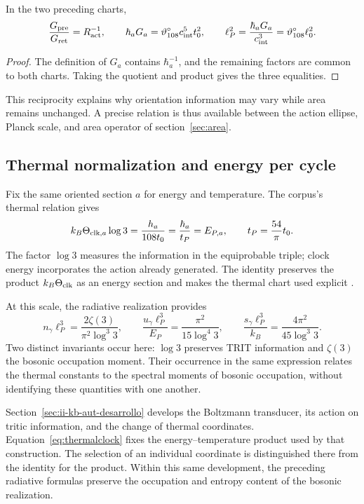 \begin{proposition}
In the two preceding charts,
\[
\frac{G_{\rm pre}}{G_{\rm ret}}=R_{\rm act}^{-1},\qquad
\hbar_aG_a=\vartheta^\circ_{108}c_{\rm int}^5t_0^2,
\qquad
\ell_P^2=\frac{\hbar_aG_a}{c_{\rm int}^3}
=\vartheta^\circ_{108}\ell_0^2.
\]
\end{proposition}
\begin{proof}
The definition of $G_a$ contains $\hbar_a^{-1}$, and the remaining factors
are common to both charts. Taking the quotient and product gives
the three equalities.
\end{proof}
This reciprocity explains why orientation information may
vary while area remains unchanged. A precise relation is thus available
between the action ellipse, Planck scale, and area operator
of section~\ref{sec:area}.

\subsection{Thermal normalization and energy per cycle}
Fix the same oriented section \(a\) for energy and
temperature. The corpus's thermal relation gives
\begin{equation}
k_B\Theta_{{\rm clk},a}\log3
=\frac{h_a}{108t_0}
=\frac{\hbar_a}{t_P}=E_{P,a},
\qquad t_P=\frac{54}{\pi}t_0.
\label{eq:thermalclock}
\end{equation}
The factor $\log3$ measures the information in the equiprobable triple;
clock energy incorporates the action already generated.
The identity preserves the product $k_B\Theta_{\rm clk}$ as an energy
section and makes the thermal chart used explicit \cite{termica}.

At this scale, the radiative realization provides
\[
n_\gamma\ell_P^3=\frac{2\zeta(3)}{\pi^2\log^3 3},\qquad
\frac{u_\gamma\ell_P^3}{E_P}
=\frac{\pi^2}{15\log^4 3},\qquad
\frac{s_\gamma\ell_P^3}{k_B}
=\frac{4\pi^2}{45\log^3 3}.
\]
Two distinct invariants occur here: $\log3$ preserves TRIT
information and $\zeta(3)$ the bosonic occupation moment.
Their occurrence in the same expression relates the thermal constants
to the spectral moments of bosonic occupation, without identifying
these quantities with one another.

Section~\ref{sec:ii-kb-aut-desarrollo} develops the Boltzmann
transducer, its action on tritic information, and the change of
thermal coordinates. Equation~\eqref{eq:thermalclock} fixes the
energy--temperature product used by that construction. The
selection of an individual coordinate is distinguished there from the
identity for the product. Within this same development, the preceding radiative formulas
preserve the occupation and entropy content
of the bosonic realization.

